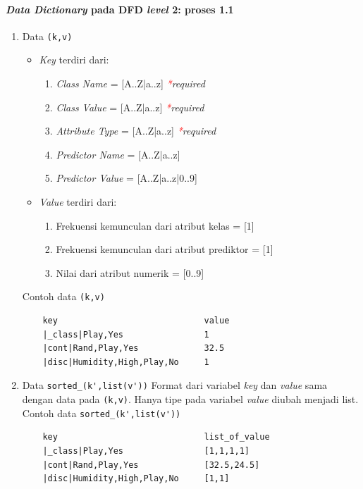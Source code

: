 \paragraph{\textit{Data Dictionary} pada DFD \textit{level} 2: proses 1.1}
\begin{enumerate}
	\item{Data \verb|(k,v)|}
	\begin{itemize}
		\item \textit{Key} terdiri dari:
		\begin{enumerate}
			\item \textit{Class Name} = [A..Z|a..z] \textit{\textcolor{red}{*}required}
			\item \textit{Class Value} = [A..Z|a..z] \textit{\textcolor{red}{*}required}
			\item \textit{Attribute Type} = [A..Z|a..z] \textit{\textcolor{red}{*}required}
			\item \textit{Predictor Name} = [A..Z|a..z]
			\item \textit{Predictor Value} = [A..Z|a..z|0..9]
		\end{enumerate}
		\item \textit{Value} terdiri dari:
		\begin{enumerate}
			\item Frekuensi kemunculan dari atribut kelas = [1]
			\item Frekuensi kemunculan dari atribut prediktor = [1]
			\item Nilai dari atribut numerik = [0..9]
		\end{enumerate}
	\end{itemize}
	Contoh data \verb|(k,v)|
	\begin{lstlisting}
	key								value
	|_class|Play,Yes				1
	|cont|Rand,Play,Yes				32.5
	|disc|Humidity,High,Play,No		1
	\end{lstlisting}
	
	\item{Data \verb|sorted_(k',list(v'))|}
	Format dari variabel \textit{key} dan \textit{value} sama dengan data pada \verb|(k,v)|. Hanya tipe pada variabel \textit{value} diubah menjadi list.\\
	Contoh data \verb|sorted_(k',list(v'))|
	\begin{lstlisting}
	key								list_of_value
	|_class|Play,Yes				[1,1,1,1]
	|cont|Rand,Play,Yes				[32.5,24.5]
	|disc|Humidity,High,Play,No		[1,1]
	\end{lstlisting}
\end{enumerate}

